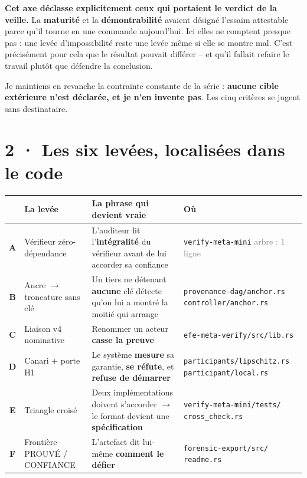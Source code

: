 \documentclass[10pt]{article}
\newcommand{\sz}[1]{\textcolor{grey}{\small\textsf{#1}}}
\newcommand{\code}[1]{\texttt{\small #1}}
\begin{document}
\begin{alerte}
\textbf{Cet axe déclasse explicitement ceux qui portaient le verdict de la veille.} La
\textbf{maturité} et la \textbf{démontrabilité} avaient désigné l'essaim attestable parce qu'il tourne
en une commande aujourd'hui. Ici elles ne comptent presque pas : une levée d'impossibilité reste une
levée même si elle se montre mal. C'est précisément pour cela que le résultat pouvait différer -- et
qu'il fallait refaire le travail plutôt que défendre la conclusion.

Je maintiens en revanche la contrainte constante de la série : \textbf{aucune cible extérieure n'est
déclarée, et je n'en invente pas}. Les cinq critères se jugent sans destinataire.
\end{alerte}

\section{2 · Les six levées, localisées dans le code}

\renewcommand{\arraystretch}{1.22}
\begin{center}\small
\begin{tabular}{@{}c >{\raggedright\arraybackslash}p{3.15cm} >{\raggedright\arraybackslash}p{6.55cm} >{\raggedright\arraybackslash}p{5.0cm}@{}}
\toprule
& \textbf{La levée} & \textbf{La phrase qui devient vraie} & \textbf{Où} \\
\midrule
\textbf{A} & Vérifieur zéro-dépendance & L'auditeur lit l'\textbf{intégralité} du vérifieur avant de lui accorder sa confiance & \code{verify-meta-mini} \sz{arbre : 1 ligne} \\
\textbf{B} & Ancre $\rightarrow$ troncature sans clé & Un tiers ne détenant \textbf{aucune} clé détecte qu'on lui a montré la moitié qui arrange & \code{provenance-dag/anchor.rs} \newline \code{controller/anchor.rs} \\
\textbf{C} & Liaison v4 nominative & Renommer un acteur \textbf{casse la preuve} & \code{efe-meta-verify/src/lib.rs} \\
\textbf{D} & Canari + porte H1 & Le système \textbf{mesure} sa garantie, \textbf{se réfute}, et \textbf{refuse de démarrer} & \code{participants/lipschitz.rs} \newline \code{participant/local.rs} \\
\textbf{E} & Triangle croisé & Deux implémentations doivent s'accorder $\rightarrow$ le format devient une \textbf{spécification} & \code{verify-meta-mini/tests/} \newline \code{cross\_check.rs} \\
\textbf{F} & Frontière PROUVÉ / CONFIANCE & L'artefact dit lui-même \textbf{comment le défier} & \code{forensic-export/src/} \newline \code{readme.rs} \\
\bottomrule
\end{tabular}
\end{center}
\end{document}
